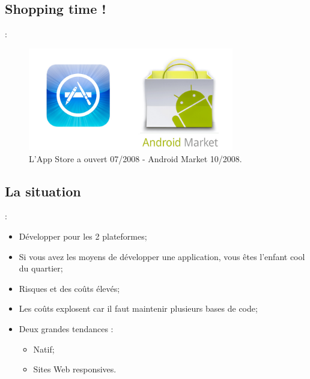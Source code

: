 \documentclass[10pt]{beamer}
\begin{document}
\subsection{Shopping time !}
\begin{frame}[fragile,t]{\secname : \subsecname}
    \begin{figure}
        \begin{center}
            \includegraphics[width=0.8\textwidth]{../assets/img/android_and_apple.jpg}
            \caption*{L'App Store a ouvert 07/2008 - Android Market 10/2008.}
            \label{Fig:android_and_apple}
        \end{center}
    \end{figure}
\end{frame}

\subsection{La situation}
\begin{frame}[fragile,t]{\secname : \subsecname}
    \begin{itemize}
        \item Développer pour les 2 plateformes;
        \item Si vous avez les moyens de développer une application, vous êtes l'enfant cool du quartier;
        \item Risques et des coûts élevés;
        \item Les coûts explosent car il faut maintenir plusieurs bases de code;
        \item Deux grandes tendances :
              \begin{itemize}
                  \item Natif;
                  \item Sites Web responsives.
              \end{itemize}
    \end{itemize}
\end{frame}
\end{document}
